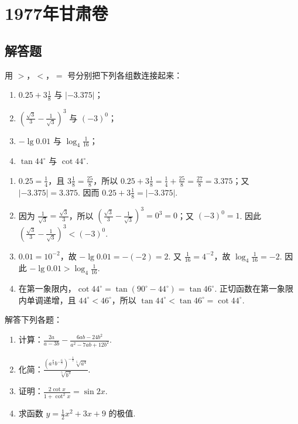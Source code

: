 \chapter{1977年甘肃卷}

\section{解答题}

\begin{problem}
用 \(>\)，\(<\)，\(=\) 号分别把下列各组数连接起来：

\begin{enumerate}
    \item \( 0.25+3\frac{1}{8} \) 与 \( \left| -3.375 \right| \)；
    \item \( \left( \frac{\sqrt{3}}{3}-\frac{1}{\sqrt{3}} \right)^3 \) 与 \( \left( -3 \right)^0 \)；
    \item \( -\lg 0.01 \) 与 \( \log_4 \frac{1}{16} \)；
    \item \( \tan 44^\circ \) 与 \( \cot 44^\circ \).
\end{enumerate}
\end{problem}

\begin{solution}
\begin{enumerate}
    \item \(0.25=\frac14\)，且 \(3\frac18=\frac{25}{8}\)，所以
    \(0.25+3\frac18=\frac14+\frac{25}{8}=\frac{27}{8}=3.375\)；又
    \(\left|-3.375\right|=3.375\). 因而
    \(0.25+3\frac18=\left|-3.375\right|\).

    \item 因为 \(\frac{1}{\sqrt3}=\frac{\sqrt3}{3}\)，所以
    \(\left(\frac{\sqrt3}{3}-\frac{1}{\sqrt3}\right)^3=0^3=0\)；又
    \(\left(-3\right)^0=1\). 因此
    \(\left(\frac{\sqrt3}{3}-\frac{1}{\sqrt3}\right)^3<\left(-3\right)^0\).

    \item \(0.01=10^{-2}\)，故 \(-\lg0.01=-(-2)=2\). 又
    \(\frac{1}{16}=4^{-2}\)，故 \(\log_4\frac{1}{16}=-2\). 因此
    \(-\lg0.01>\log_4\frac{1}{16}\).

    \item 在第一象限内，\(\cot44^\circ=\tan\left(90^\circ-44^\circ\right)=\tan46^\circ\). 正切函数在第一象限内单调递增，且 \(44^\circ<46^\circ\)，所以
    \(\tan44^\circ<\tan46^\circ=\cot44^\circ\).
\end{enumerate}
\end{solution}


\begin{problem}
解答下列各题：

\begin{enumerate}
    \item 计算：\( \frac{2a}{a-3b}-\frac{6ab-24b^2}{a^2-7ab+12b^2} \).
    \item 化简：\( \frac{\left( a^{\frac{8}{5}}b^{-\frac{6}{5}} \right)^{-\frac{1}{2}}\sqrt[5]{a^4}}{\sqrt[5]{b^3}} \).
    \item 证明：\( \frac{2\cot x}{1+\cot^2 x}=\sin 2x \).
    \item 求函数 \( y=\frac{1}{2}x^2+3x+9 \) 的极值.
\end{enumerate}
\end{problem}

